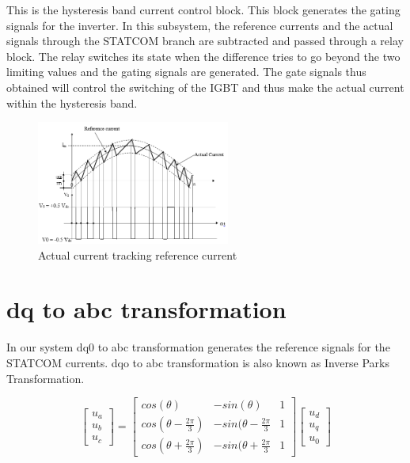 \documentclass[journal,twoside]{IEEEtran}
\begin{document}
This is the hysteresis band current control block. This
block generates the gating signals for the
inverter. In this subsystem, the reference
currents and the actual signals through the
STATCOM branch are subtracted and passed
through a relay block. The relay switches its state
when the difference tries to go beyond the two
limiting values and the gating signals are
generated. The gate signals thus obtained will
control the switching of the IGBT and thus make
the actual current within the hysteresis band.

\begin{figure}[!ht]
\includegraphics[width=2.5in]{7}
\caption{Actual current tracking reference current}
\label{f7}
\end{figure}

\section{dq to abc transformation}


In our system dq0 to abc transformation
generates the reference signals for the
STATCOM currents. dqo to abc transformation is
also known as Inverse Parks Transformation.

\[
\begin{bmatrix}
u_a \\ u_b \\ u_c
\end{bmatrix}
=
  \begin{bmatrix}
    cos(\theta) & -sin(\theta) & 1\\cos(\theta-\frac{2\pi}{3}) & -sin(\theta-\frac{2\pi}{3} & 1\\ cos(\theta+\frac{2\pi}{3}) & -sin(\theta+\frac{2\pi}{3} & 1
  \end{bmatrix}
\begin{bmatrix}
u_d \\ u_q \\ u_0
\end{bmatrix}
\]

\end{document}
